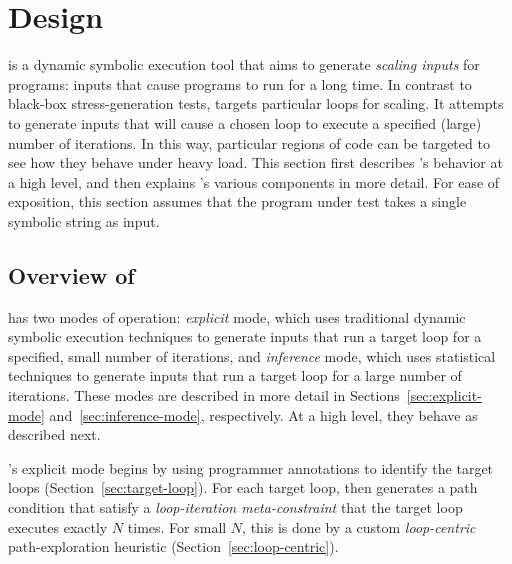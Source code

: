 \section{Design}\label{sec:method}

\lancet is a dynamic symbolic execution tool that aims to generate {\em scaling inputs} for programs: inputs that cause programs to run for a long time. In contrast to black-box stress-generation tests, \lancet targets particular loops for scaling. It attempts to generate inputs that will cause a chosen loop to execute a specified (large) number of iterations. In this way, particular regions of code can be targeted to see how they behave under heavy load. This section first describes \lancet's behavior at a high level, and then explains \lancet's various components in more detail. %
For ease of exposition, this section assumes that the program under test takes a single symbolic string as input.

\subsection{Overview of \lancet}
\label{sec:overview}

\lancet has two modes of operation: {\em explicit} mode, which uses traditional dynamic symbolic execution techniques to generate inputs that run a target loop for a specified, small number of iterations, and {\em inference} mode, which uses statistical techniques to generate inputs that run a target loop for a large number of iterations. These modes are described in more detail in Sections~\ref{sec:explicit-mode} and~\ref{sec:inference-mode}, respectively. At a high level, they behave as described next.

\lancet's explicit mode begins by using programmer annotations to identify the target loops (Section~\ref{sec:target-loop}). For each target loop, \lancet then generates a path condition that satisfy a {\em loop-iteration meta-constraint} that the target loop executes exactly $N$ times. For small $N$, this is done by a custom {\em loop-centric} path-exploration heuristic (Section~\ref{sec:loop-centric}).

